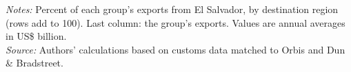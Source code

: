 \documentclass[11pt,a4paper]{article}
\begin{document}
\begin{table}[H]\centering\small%
  \caption{El Salvador, Other Goods: Multinational Exports by Parent Region and Destination Region}%
  \label{tab:c_reg_SLV_rest}%
  \par\vspace{3pt}%
  \begin{minipage}{0.95\textwidth}\footnotesize %
  \textit{Notes:} Percent of each group's exports from El Salvador, by destination region (rows add to 100). Last column: the group's exports. Values are annual averages in US\$ billion.\\[3pt]%
  \textit{Source:} Authors' calculations based on customs data matched to Orbis and Dun \& Bradstreet.%
  \end{minipage}%
  \end{table}
\end{document}
